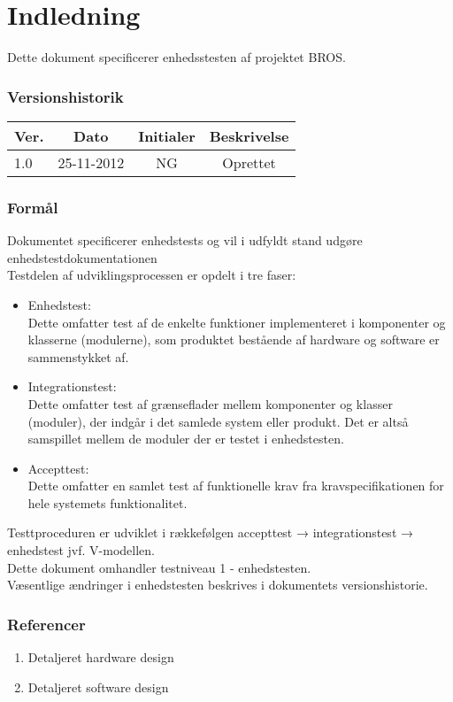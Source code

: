 \chapter{Indledning}
Dette dokument specificerer enhedsstesten af projektet BROS.
\subsection*{Versionshistorik}
\begin{table}[htbp]
\centering
\begin{tabular}{| l  | c | c | c |}
\hline
Ver. &Dato &Initialer &Beskrivelse\\\hline
1.0 &25-11-2012 &NG &Oprettet\\\hline
\end{tabular}
\end{table}
\subsection{Formål}
Dokumentet specificerer enhedstests og vil i udfyldt stand udgøre enhedstestdokumentationen\\
Testdelen af udviklingsprocessen er opdelt i tre faser:\\
\begin{itemize}
\item Enhedstest:\\
Dette omfatter test af de enkelte funktioner implementeret i komponenter og klasserne (modulerne), som produktet bestående af hardware og software er sammenstykket af.
\item Integrationstest:\\
Dette omfatter test af grænseflader mellem komponenter og klasser (moduler), der indgår i det samlede system eller produkt. Det er altså samspillet mellem de moduler der er testet i enhedstesten.
\item Accepttest:\\
Dette omfatter en samlet test af funktionelle krav fra kravspecifikationen for hele systemets funktionalitet.
\end{itemize}
Testtproceduren er udviklet i rækkefølgen accepttest → integrationstest → enhedstest jvf. V-modellen.\\
Dette dokument omhandler testniveau 1 - enhedstesten.\\
Væsentlige ændringer i enhedstesten beskrives i dokumentets versionshistorie.\\
\subsection{Referencer}
\begin{enumerate}
\item Detaljeret hardware design
\item Detaljeret software design
\end{enumerate}
